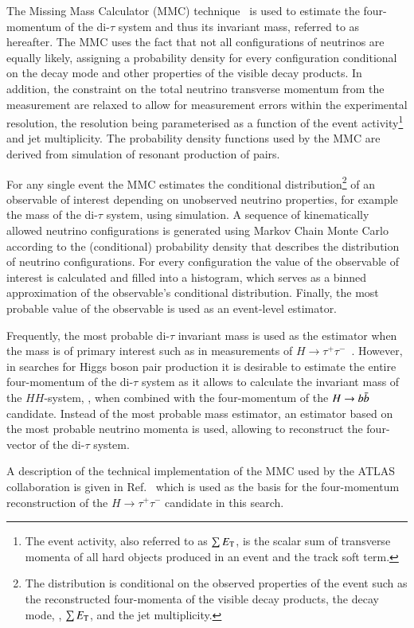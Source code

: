 The Missing Mass Calculator (MMC) technique~\cite{Elagin:2010aw} is
used to estimate the four-momentum of the di-$\tau$ system and thus
its invariant mass, referred to as \mMMC hereafter. The MMC uses the
fact that not all configurations of neutrinos are equally likely,
assigning a probability density for every configuration conditional on
the \taulepton decay mode and other properties of the visible decay
products. In addition, the constraint on the total neutrino transverse
momentum from the \pTmiss measurement are relaxed to allow for
measurement errors within the experimental resolution, the resolution
being parameterised as a function of the event activity\footnote{The
  event activity, also referred to as $\sum E_{\text{T}}$, is the scalar sum
  of transverse momenta of all hard objects produced in an event and
  the track soft term.} and jet multiplicity. The probability density
functions used by the MMC are derived from simulation of resonant
production of \taulepton pairs.

For any single event the MMC estimates the conditional
distribution\footnote{The distribution is conditional on the observed
  properties of the event such as the reconstructed four-momenta of
  the visible \taulepton decay products, the \taulepton decay mode,
  \pTmiss, $\sum E_{\text{T}}$, and the jet multiplicity.} of an observable of
interest depending on unobserved neutrino properties, for example the
mass of the di-$\tau$ system, using simulation. %
A sequence of kinematically allowed neutrino configurations is
generated using Markov Chain Monte Carlo according to the
(conditional) probability density that describes the distribution of
neutrino configurations. For every configuration the value of the
observable of interest is calculated and filled into a histogram,
which serves as a binned approximation of the observable's conditional
distribution. Finally, the most probable value of the observable is
used as an event-level estimator.

Frequently, the most probable di-$\tau$ invariant mass is used as the
estimator when the mass is of primary interest such as in measurements
of $H \to \tau^{+}\tau^{-}$~\cite{HIGG-2019-09}. However, in searches
for Higgs boson pair production it is desirable to estimate the entire
four-momentum of the di-$\tau$ system as it allows to calculate the
invariant mass of the $HH$-system, \mHH, when combined with the
four-momentum of the $H \to b\bar{b}$ candidate. Instead of the most
probable mass estimator, an estimator based on the most probable
neutrino momenta is used, allowing to reconstruct the four-vector of
the di-$\tau$ system.

A description of the technical implementation of the MMC used by the
ATLAS collaboration is given in Ref.~\cite{huebner} which is used as
the basis for the four-momentum reconstruction of the
$H \to \tau^{+}\tau^{-}$ candidate in this search.

